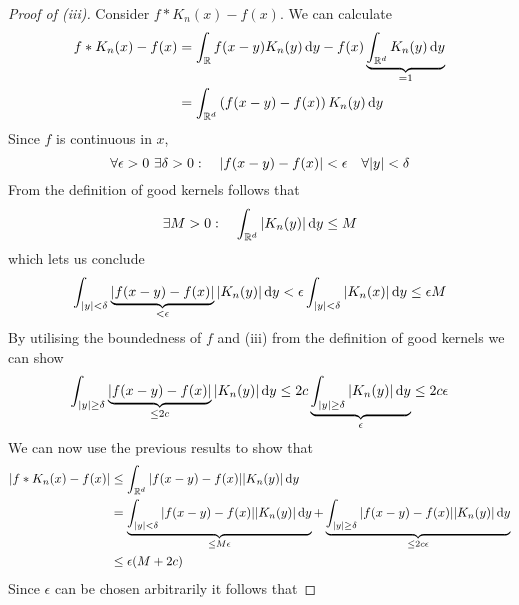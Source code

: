 \documentclass[../../script.tex]{subfiles}
\begin{document}
\begin{proof}[Proof of  (iii)]
    Consider $f * K_n(x) - f(x)$. We can calculate 
    \begin{equation}
        \begin{split}
            f * K_n(x) - f(x) &= \int_{\mathbb{R}} f(x - y) K_n(y) \dd{y} - f(x) \underbrace{\int_{\mathbb{R}^d} K_n(y) \dd{y}}_{=1} \\
            &= \int_{\mathbb{R}^d} \left(f(x - y) - f(x) \right) K_n(y) \dd{y}
        \end{split}
    \end{equation}
    Since $f$ is continuous in $x$, 
    \begin{equation}
        \forall \epsilon > 0 ~\exists \delta > 0: \quad \abs{f(x - y) - f(x)} < \epsilon \quad \forall \abs{y} < \delta
    \end{equation}
    From the definition of good kernels follows that 
    \begin{equation}
        \exists M > 0: \quad \int_{\mathbb{R}^d} \abs{K_n(y)} \dd{y} \le M
    \end{equation}
    which lets us conclude 
    \begin{equation}
        \int_{\abs{y} < \delta} \underbrace{\abs{f(x - y) - f(x)}}_{< \epsilon} \abs{K_n(y)} \dd{y} < \epsilon \int_{\abs{y} < \delta} \abs{K_n(x)} \dd{y} \le \epsilon M
    \end{equation}
    By utilising the boundedness of $f$ and (iii) from the definition of good kernels we can show
    \begin{equation}
        \int_{\abs{y} \ge \delta} \underbrace{\abs{f(x - y) - f(x)}}_{\le 2c} \abs{K_n(y)} \dd{y} \le 2c \underbrace{\int_{\abs{y} \ge \delta} \abs{K_n(y)} \dd{y}}_{\epsilon} \le 2c\epsilon
    \end{equation}
    We can now use the previous results to  show that 
    \begin{equation}
        \begin{split}
            \abs{f * K_n(x) - f(x)} &\le \int_{\mathbb{R}^d} \abs{f(x - y) - f(x)} \abs{K_n(y)} \dd{y} \\
            &= \underbrace{\int_{\abs{y} < \delta} \abs{f(x - y) - f(x)} \abs{K_n(y)} \dd{y}}_{\le M\epsilon} + \underbrace{\int_{\abs{y} \ge \delta} \abs{f(x - y) - f(x)} \abs{K_n(y)} \dd{y}}_{\le 2c\epsilon} \\
            &\le \epsilon(M + 2c)
        \end{split}
    \end{equation}
    Since $\epsilon$ can be chosen arbitrarily it follows that 

\end{proof}
\end{document}

